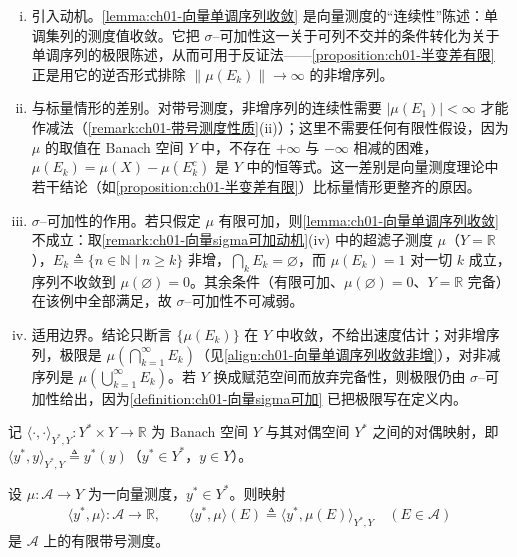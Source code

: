 \documentclass[../../main.tex]{subfiles}%
\begin{document}
\begin{remark}\label{remark:ch01-向量单调序列收敛注}
\begin{enumerate}[(i)]
\item 引入动机。\cref{lemma:ch01-向量单调序列收敛} 是向量测度的“连续性”陈述：单调集列的测度值收敛。它把 $\sigma$--可加性这一关于可列不交并的条件转化为关于单调序列的极限陈述，从而可用于反证法——\cref{proposition:ch01-半变差有限} 正是用它的逆否形式排除 $\|\mu(E_k)\|\to\infty$ 的非增序列。
\item 与标量情形的差别。对带号测度，非增序列的连续性需要 $|\mu(E_1)|<\infty$ 才能作减法（\cref{remark:ch01-带号测度性质}(ii)）；这里不需要任何有限性假设，因为 $\mu$ 的取值在 Banach 空间 $Y$ 中，不存在 $+\infty$ 与 $-\infty$ 相减的困难，$\mu(E_k)=\mu(X)-\mu(E_k^c)$ 是 $Y$ 中的恒等式。这一差别是向量测度理论中若干结论（如\cref{proposition:ch01-半变差有限}）比标量情形更整齐的原因。
\item $\sigma$--可加性的作用。若只假定 $\mu$ 有限可加，则\cref{lemma:ch01-向量单调序列收敛} 不成立：取\cref{remark:ch01-向量sigma可加动机}(iv) 中的超滤子测度 $\mu$（$Y=\mathbb{R}$），$E_k\triangleq\{n\in\mathbb{N}\mid n\geqslant k\}$ 非增，$\bigcap_k E_k=\varnothing$，而 $\mu(E_k)=1$ 对一切 $k$ 成立，序列不收敛到 $\mu(\varnothing)=0$。其余条件（有限可加、$\mu(\varnothing)=0$、$Y=\mathbb{R}$ 完备）在该例中全部满足，故 $\sigma$--可加性不可减弱。
\item 适用边界。结论只断言 $\{\mu(E_k)\}$ 在 $Y$ 中收敛，不给出速度估计；对非增序列，极限是 $\mu\left(\bigcap_{k=1}^\infty E_k\right)$（见\eqref{align:ch01-向量单调序列收敛非增}），对非减序列是 $\mu\left(\bigcup_{k=1}^\infty E_k\right)$。若 $Y$ 换成赋范空间而放弃完备性，则极限仍由 $\sigma$--可加性给出，因为\cref{definition:ch01-向量sigma可加} 已把极限写在定义内。
\end{enumerate}
\end{remark}

记 $\langle\cdot,\cdot\rangle_{Y^*,Y}:Y^*\times Y\to\mathbb{R}$ 为 Banach 空间 $Y$ 与其对偶空间 $Y^*$ 之间的对偶映射，即 $\langle y^*,y\rangle_{Y^*,Y}\triangleq y^*(y)$（$y^*\in Y^*$，$y\in Y$）。

\begin{proposition}\label{proposition:ch01-向量标量化}
设 $\mu:\mathcal{A}\to Y$ 为一向量测度，$y^*\in Y^*$。则映射
\begin{align}
\langle y^*,\mu\rangle:\mathcal{A}\to\mathbb{R},\qquad
\langle y^*,\mu\rangle(E)\triangleq \langle y^*,\mu(E)\rangle_{Y^*,Y}\quad(E\in\mathcal{A}) \label{align:ch01-标量化}
\end{align}
是 $\mathcal{A}$ 上的有限带号测度。
\end{proposition}
\end{document}
